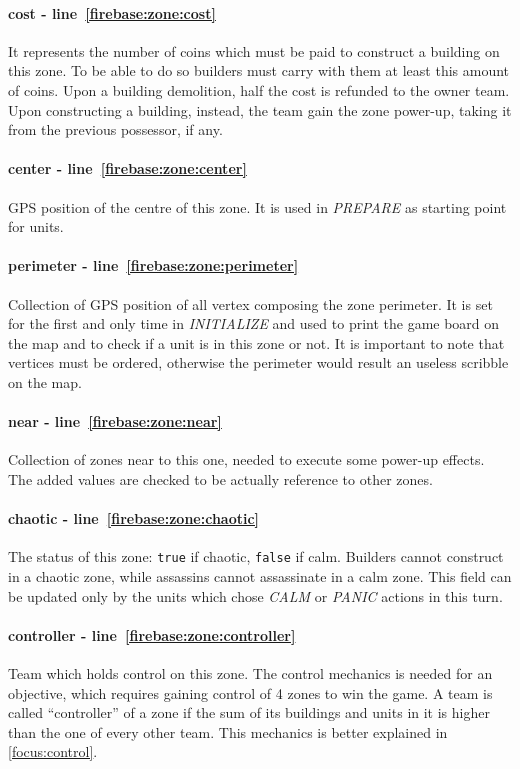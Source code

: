 				\paragraph{cost - line~\ref{firebase:zone:cost}}
				It represents the number of coins which must be paid to construct a building on this zone. To be able to do so builders must carry with them at least this amount of coins. Upon a building demolition, half the cost is refunded to the owner team. Upon constructing a building, instead, the team gain the zone power-up, taking it from the previous possessor, if any.
				
				\paragraph{center - line~\ref{firebase:zone:center}}
				GPS position of the centre of this zone. It is used in \emph{PREPARE} as starting point for units.
				
				\paragraph{perimeter - line~\ref{firebase:zone:perimeter}}
				Collection of GPS position of all vertex composing the zone perimeter. It is set for the first and only time in \emph{INITIALIZE} and used to print the game board on the map and to check if a unit is in this zone or not. It is important to note that vertices must be ordered, otherwise the perimeter would result an useless scribble on the map.
				
				\paragraph{near - line~\ref{firebase:zone:near}}
				Collection of zones near to this one, needed to execute some power-up effects.
				The added values are checked to be actually reference to other zones.
				
				\paragraph{chaotic - line~\ref{firebase:zone:chaotic}}
				The status of this zone: \lstinline|true| if chaotic, \lstinline|false| if calm. Builders cannot construct in a chaotic zone, while assassins cannot assassinate in a calm zone. This field can be updated only by the units which chose \emph{CALM} or \emph{PANIC} actions in this turn.
				
				\paragraph{controller - line~\ref{firebase:zone:controller}}
				Team which holds control on this zone. The control mechanics is needed for an objective, which requires gaining control of 4 zones to win the game. A team is called “controller” of a zone if the sum of its buildings and units in it is higher than the one of every other team. This mechanics is better explained in \autoref{focus:control}.
				
